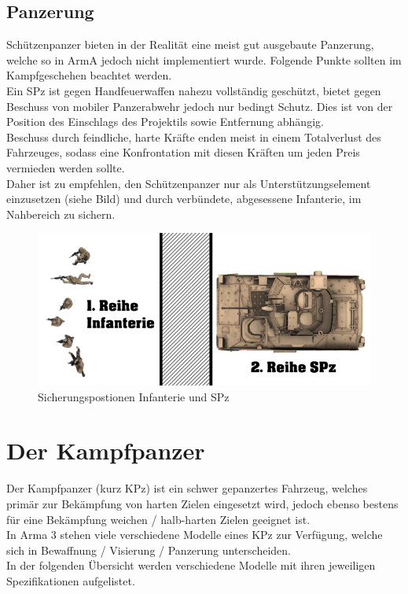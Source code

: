 \subsection{Panzerung}
	Schützenpanzer bieten in der Realität eine meist gut ausgebaute Panzerung, welche so in ArmA jedoch nicht implementiert wurde. Folgende Punkte sollten im Kampfgeschehen beachtet werden.\\

	Ein SPz ist gegen Handfeuerwaffen nahezu vollständig geschützt, bietet gegen Beschuss von mobiler Panzerabwehr jedoch nur bedingt Schutz. Dies ist von der Position des Einschlags des Projektils sowie Entfernung abhängig.\\
	Beschuss durch feindliche, harte Kräfte enden meist in einem Totalverlust des Fahrzeuges, sodass eine Konfrontation mit diesen Kräften um jeden Preis vermieden werden sollte.\\

	Daher ist zu empfehlen, den Schützenpanzer nur als Unterstützungselement einzusetzen (siehe Bild) und durch verbündete, abgesessene Infanterie, im Nahbereich zu sichern.\\
	\begin{figure}[htbp]
		\centering
		\includegraphics[width=0.95\linewidth]{./img/tutorials/sbz/reihe}
		\caption{Sicherungspostionen Infanterie und SPz}
	\end{figure}

\section{Der Kampfpanzer}
	Der Kampfpanzer (kurz KPz) ist ein schwer gepanzertes Fahrzeug, welches primär zur Bekämpfung von harten Zielen eingesetzt wird, jedoch ebenso bestens für eine Bekämpfung weichen / halb-harten Zielen geeignet ist.\\

	In Arma 3 stehen viele verschiedene Modelle eines KPz zur Verfügung, welche sich in Bewaffnung / Visierung / Panzerung unterscheiden.\\
	In der folgenden Übersicht werden verschiedene Modelle mit ihren jeweiligen Spezifikationen aufgelistet.\\

